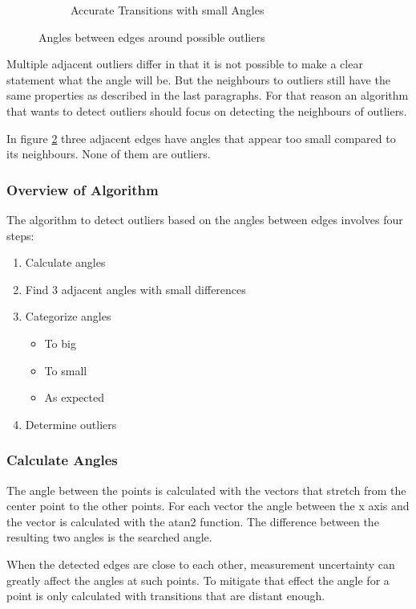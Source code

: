 \begin{figure}[H]
\begin{subfigure}{.33\textwidth}
	\caption{Accurate Transitions  with small Angles}
	\label{fig:nonOutlier}
\end{subfigure}
\caption{Angles between edges around possible outliers}
\end{figure}

Multiple adjacent outliers differ in that it is not possible to make a clear statement what the angle will be. But the neighbours to outliers still have the same properties as described in the last paragraphs. For that reason an algorithm that wants to detect outliers should focus on detecting the neighbours of outliers.

In figure \ref{fig:nonOutlier} three adjacent edges have angles that appear too small compared to its neighbours. None of them are outliers.

\subsubsection{Overview of Algorithm}
\label{sec:descriptionOfAngleValidation}

The algorithm to detect outliers based on the angles between edges involves four steps:

\begin{enumerate}
	\item Calculate angles
	\item Find 3 adjacent angles with small differences
	\item Categorize angles
	\begin{itemize}
		\item To big
		\item To small
		\item As expected 
	\end{itemize}
	\item Determine outliers
\end{enumerate}
\subsubsection{Calculate Angles}
\label{sec:calculateAngles}
The angle between the points is calculated with the vectors that stretch from the center point to the other points. For each vector the angle between the x axis and the vector is calculated with the \gls{atan2} function. The difference between the resulting two angles is the searched angle.

When the detected edges are close to each other, measurement uncertainty can greatly affect the angles at such points. To mitigate that effect the angle for a point is only calculated with transitions that are distant enough.
